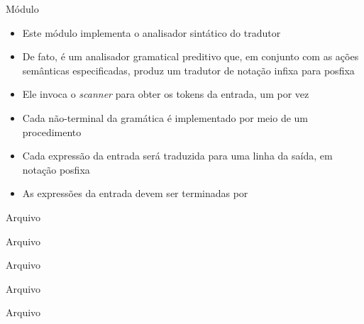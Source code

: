 \begin{frame}[fragile]{Módulo }

    \begin{itemize}
        \item Este módulo implementa o analisador sintático do tradutor
        \pause

        \item De fato, é um analisador gramatical preditivo que, em conjunto com as ações semânticas especificadas, produz um tradutor de notação infixa para
            posfixa
        \pause

        \item Ele invoca o \textit{scanner} para obter os tokens da entrada, um por vez
        \pause

        \item Cada não-terminal da gramática é implementado por meio de um procedimento
        \pause

        \item Cada expressão da entrada será traduzida para uma linha da saída, em notação posfixa
        \pause

        \item As expressões da entrada devem ser terminadas por 
    \end{itemize}

\end{frame}

\begin{frame}[fragile]{Arquivo }
\end{frame}

\begin{frame}[fragile]{Arquivo }
\end{frame}

\begin{frame}[fragile]{Arquivo }
\end{frame}

\begin{frame}[fragile]{Arquivo }
\end{frame}

\begin{frame}[fragile]{Arquivo }
\end{frame}

